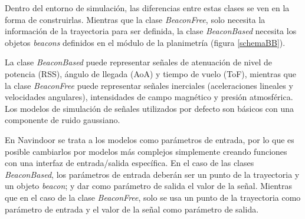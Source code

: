 Dentro del entorno de simulación, las diferencias entre estas clases se ven en la forma de construirlas. Mientras que la clase \emph{BeaconFree}, solo necesita la información de la trayectoria para ser definida, la clase \emph{BeaconBased} necesita los objetos \emph{beacons} definidos en el módulo de la planimetría (figura \ref{schemaBB}). 

La clase \emph{BeaconBased} puede representar señales de atenuación de nivel de potencia (RSS), ángulo de llegada (AoA) y tiempo de vuelo (ToF), mientras que la clase \emph{BeaconFree} puede representar señales inerciales (aceleraciones lineales y velocidades angulares), intensidades de campo magnético y presión atmosférica. Los modelos de simulación de señales utilizados por defecto son básicos con una componente de ruido gaussiano.




En Navindoor se trata a los modelos como parámetros de entrada, por lo que es posible cambiarlos por modelos más complejos simplemente creando funciones con una interfaz de entrada/salida específica. En el caso de las clases \emph{BeaconBased}, los parámetros de entrada deberán ser un punto de la trayectoria y un objeto \emph{beacon}; y dar como parámetro de salida el valor de la señal. Mientras que en el caso de la clase \emph{BeaconFree}, solo se usa un punto de la trayectoria como parámetro de entrada y el valor de la señal como parámetro de salida.

